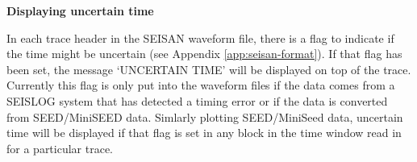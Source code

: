 \textbf{Displaying uncertain time}

In each trace header in the SEISAN waveform file, there is a flag to indicate if the time might be uncertain (see Appendix \ref{app:seisan-format}). If that flag has been set, the message `UNCERTAIN TIME' will be displayed on top of the trace. Currently this flag is only put into the waveform files if the data comes from a SEISLOG system that has detected a timing error or if the data is converted from SEED/MiniSEED data. Simlarly plotting SEED/MiniSeed data, uncertain time will be displayed if that flag is set in any block in the time window read in for a particular trace. 

